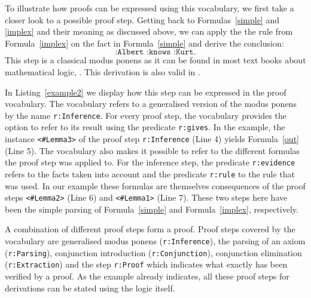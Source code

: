 To illustrate how proofs can be expressed using this vocabulary, we first take a closer look to a possible proof step. Getting back to Formulas~\ref{simple} and \ref{implex} and 
their meaning as discussed above, 
 we can apply the the rule from Formula~\ref{implex} on the fact in Formula~\ref{simple} and derive the conclusion:
\begin{equation}
\texttt{:Albert :knows :Kurt.}\label{out}
\end{equation}
This step is a classical modus ponens as it can be found in most text books about mathematical logic, \eg \cite{enderton,mendelson,ebbinghaus}.
This derivation is also valid in \nthree. 

In Listing~\ref{example2} we display how this step can be expressed in the proof vocabulary. The vocabulary refers to a generalised version of the modus ponens by the 
name \texttt{r:Inference}. 
For every proof step, the vocabulary provides the option to refer to its result using the predicate \texttt{r:gives}.
In the example, the instance \texttt{<\#Lemma3>} of the proof  step \texttt{r:Inference} (Line 4) yields Formula~\ref{out} (Line 5). The vocabulary also makes it possible to 
refer to the different formulas the proof step was applied to. For the inference step, the predicate \texttt{r:evidence} refers to the facts taken into account and the 
predicate \texttt{r:rule} to the rule that was used. In our example these formulas are themselves consequences of the proof steps \texttt{<\#Lemma2>} (Line 6)
and \texttt{<\#Lemma1>} (Line 7). 
These two steps here have been the simple parsing of Formula~\ref{simple} and Formula~\ref{implex}, respectively. 

A combination of different  proof steps form a proof. Proof steps covered by the vocabulary are generalised modus ponens (\texttt{r:Inference}), the parsing of an axiom 
(\texttt{r:Parsing}), conjunction introduction (\texttt{r:Conjunction}), conjunction elimination (\texttt{r:Extraction}) and the step \texttt{r:Proof} which indicates what exactly 
has been verified by a proof. As the example already indicates, all these proof steps for \nthree derivations can be stated using the logic itself. 

